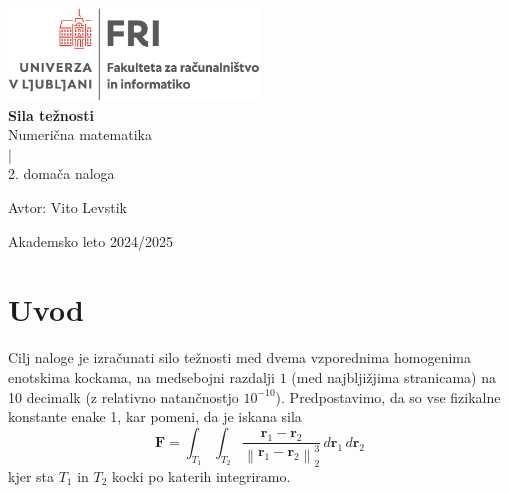 \documentclass[11pt, titlepage]{article}
\begin{document}
\begin{titlepage}
    \begin{center}
        \includegraphics[width=0.5\textwidth]{figures/FRI_logo.png}\\
        \vspace{0.5cm}
        \vspace{3cm}
        {\LARGE \bf Sila težnosti} \\
        \vspace{0.3cm}
        \vspace{2.0cm}
        {\large Numerična matematika}\\
        \vspace{0.2cm}
        {|}\\
        \vspace{0.2cm}
        {\large 2. domača naloga}\\
        \vspace{2.0cm}
    \end{center}
    \vfill
    \begin{flushleft}
        {\normalsize {\sf Avtor:} Vito Levstik\\}
    \end{flushleft}
    \vspace{2cm}
    \begin{center}
        {\normalsize \sc Akademsko leto 2024/2025}
    \end{center}
\end{titlepage}

\newpage

\section{Uvod}

Cilj naloge je izračunati silo težnosti med dvema vzporednima homogenima enotskima kockama, na medsebojni razdalji $1$ (med najbljižjima stranicama) na 10 decimalk (z relativno natančnostjo $10^{-10}$). Predpostavimo, da so vse fizikalne konstante enake 1, kar pomeni, da je iskana sila
$$
\mathbf{F} = \int_{T_1} \int_{T_2} \frac{\mathbf{r}_1 - \mathbf{r}_2}{\left\lVert \mathbf{r}_1 - \mathbf{r}_2 \right\rVert_2^3} \, d\mathbf{r}_1 \, d\mathbf{r}_2
$$
kjer sta $T_1$ in $T_2$ kocki po katerih integriramo.
\end{document}
